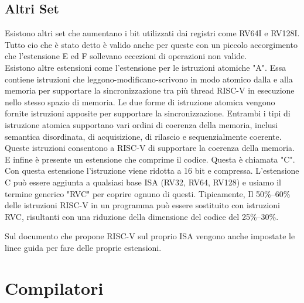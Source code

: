 \documentclass[12pt,a4paper]{report}
\begin{document}
\section{ Altri Set}
Esistono altri set che aumentano i bit utilizzati dai registri come RV64I e RV128I. Tutto cio che è stato detto è valido anche per queste con un piccolo accorgimento che l'estensione E ed F sollevano eccezioni di operazioni non valide.\\
Esistono altre estensioni come l'estensione per le istruzioni atomiche "A". Essa  contiene istruzioni che leggono-modificano-scrivono in modo atomico dalla e alla memoria per supportare la sincronizzazione tra
più thread RISC-V in esecuzione nello stesso spazio di memoria. Le due forme di istruzione atomica
vengono fornite istruzioni apposite per supportare la sincronizzazione. Entrambi i tipi di istruzione atomica supportano vari ordini di coerenza della memoria, inclusi
semantica disordinata, di acquisizione, di rilascio e sequenzialmente coerente. Queste istruzioni consentono a RISC-V di supportare la coerenza della memoria.\\
E infine è presente un estensione che comprime il codice. Questa è chiamata "C". Con questa estensione l'istruzione viene ridotta a 16 bit e compressa. L'estensione C può essere aggiunta a qualsiasi base
ISA (RV32, RV64, RV128) e usiamo il termine generico "RVC" per coprire ognuno di questi. Tipicamente,
Il 50\%–60\% delle istruzioni RISC-V in un programma può essere sostituito con istruzioni RVC, risultanti
con una riduzione della dimensione del codice del 25\%–30\%.


Sul documento che propone RISC-V sul proprio ISA vengono anche impostate le linee guida per fare delle proprie estensioni.



\chapter{Compilatori}

\end{document}
